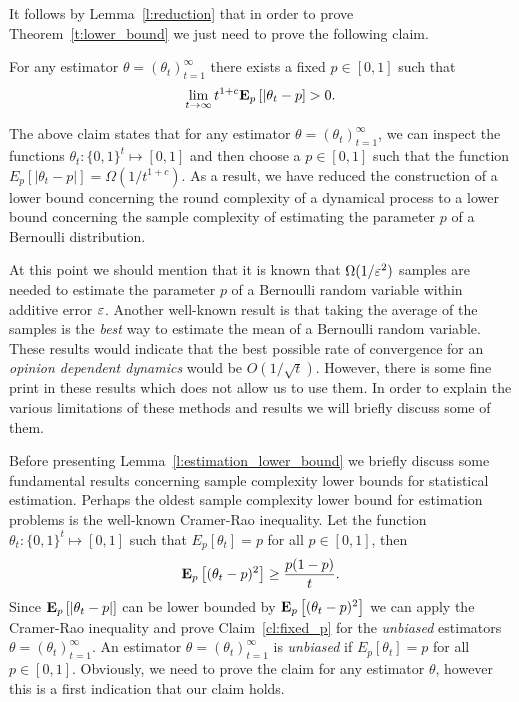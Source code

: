\noindent It follows by Lemma~\ref{l:reduction} that in order to prove Theorem~\ref{t:lower_bound} we
just need to prove the following claim.

\begin{claim}\label{cl:fixed_p}
  For any estimator $\theta = (\theta_t)_{t=1}^\infty$
  there exists a fixed $p \in [0,1]$ such that
  \[
    \lim_{t \to \infty} t^{1+c} \bm{\mathrm{E}}_{p} \left[ |\theta_t - p \right] > 0.
  \]
\end{claim}
The above claim states that for any estimator $\theta=(\theta_t)_{t=1}^\infty$,
we can inspect the functions $\theta_t: \{0,1\}^t \mapsto [0,1]$ and then choose
a $p \in [0,1]$ such that the function $E_p[|\theta_t-p|]= \Omega(1/t^{1+c})$. As
a result, we have reduced the construction of a lower bound concerning the round
complexity of a dynamical process to a lower bound concerning the sample complexity of
estimating the parameter $p$ of a Bernoulli distribution.

At this point we should mention that it is known
that $\Omega(1/\varepsilon^2)$ samples are needed to estimate the parameter $p$
of a Bernoulli random variable within additive error $\varepsilon$.
Another well-known result is that taking the average of the samples
is the \emph{best} way to estimate the mean of a Bernoulli random variable.
These results would indicate that the best possible rate of convergence
for an \emph{opinion dependent dynamics} would be $O(1/\sqrt{t})$.
However, there is some fine print in these results which does not allow us
to use them. In order to explain the various limitations of
these methods and results we will briefly discuss some of them.

Before presenting Lemma~\ref{l:estimation_lower_bound} we briefly discuss some
fundamental results concerning sample complexity lower bounds for statistical estimation.
Perhaps the oldest sample complexity lower bound for estimation problems
is the well-known Cramer-Rao inequality.
Let the function $\theta_t: \{0,1\}^t \mapsto [0,1]$ such that $E_p[\theta_t]=p$ for
all $p \in [0,1]$, then
\begin{equation}\label{eq:crlb}
  \bm{\mathrm{E}}_{p} \left[ (\theta_t - p)^2 \right] \geq \frac{p(1-p)}{t}.
\end{equation}
Since $\bm{\mathrm{E}}_{p} \left[ |\theta_t - p| \right]$ can be lower bounded
by $\bm{\mathrm{E}}_{p} \left[ (\theta_t - p)^2 \right]$ we can apply the Cramer-Rao inequality and
prove Claim~\ref{cl:fixed_p} for the \emph{unbiased} estimators
$\theta =(\theta_t)_{t=1}^\infty$. An estimator $\theta =(\theta_t)_{t=1}^\infty$
is \emph{unbiased} if $E_p[\theta_t]=p$ for all $p \in [0,1]$. Obviously, we need
to prove the claim for any estimator $\theta$, however this is a first indication
that our claim holds.

